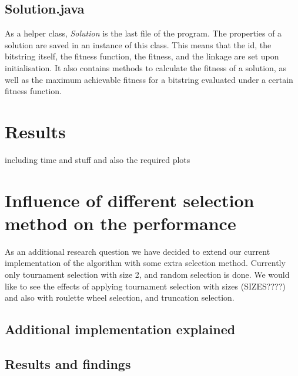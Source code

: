 \documentclass[10pt,a4paper,onecolumn]{article}
\begin{document}
\subsection{Solution.java}
As a helper class, \textit{Solution} is the last file of the program. The properties of a solution are saved in an instance of this class. This means that the id, the bitstring itself, the fitness function, the fitness, and the linkage are set upon initialisation. It also contains methods to calculate the fitness of a solution, as well as the maximum achievable fitness for a bitstring evaluated under a certain fitness function.

\section{Results} \label{sec:results}
including time and stuff
and also the required plots

\section{Influence of different selection method on the performance}
\label{sec:research}
As an additional research question we have decided to extend our current implementation of the algorithm with some extra selection method. Currently only tournament selection with size 2, and random selection is done. We would like to see the effects of applying tournament selection with sizes (SIZES????) and also with roulette wheel selection, and truncation selection.

\subsection{Additional implementation explained}

\subsection{Results and findings}
\end{document}
